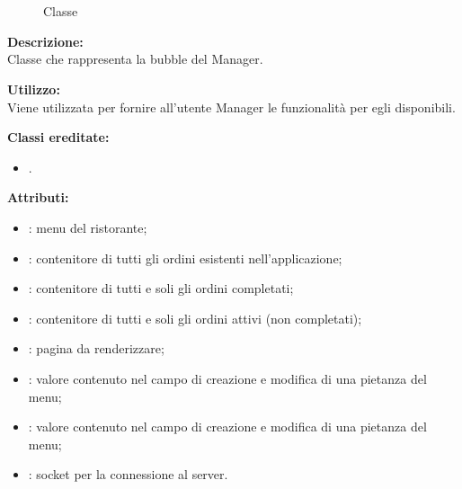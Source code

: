 \paragraph[::Manager::BubbleManager]{\class}\mbox{}\\ \label{\class}
\begin{figure}[H]
	\centering
	\caption{Classe \class}
\end{figure}
\textbf{Descrizione:}\\
Classe che rappresenta la bubble del Manager.

\textbf{Utilizzo:}\\
Viene utilizzata per fornire all'utente Manager le funzionalità per egli disponibili.

\textbf{Classi ereditate:}
\begin{itemize}
	\item {}.
\end{itemize}
%

\textbf{Attributi:}
\begin{itemize}
	\item {}: menu del ristorante;
	\item {}: contenitore di tutti gli ordini esistenti nell'applicazione;
	\item {}: contenitore di tutti e soli gli ordini completati;
	\item {}: contenitore di tutti e soli gli ordini attivi (non completati);
	\item {}: pagina da renderizzare;
	\item {}: valore contenuto nel campo  di creazione e modifica di una pietanza del menu;
	\item {}: valore contenuto nel campo  di creazione e modifica di una pietanza del menu;
	\item {}: socket per la connessione al server.
\end{itemize}

